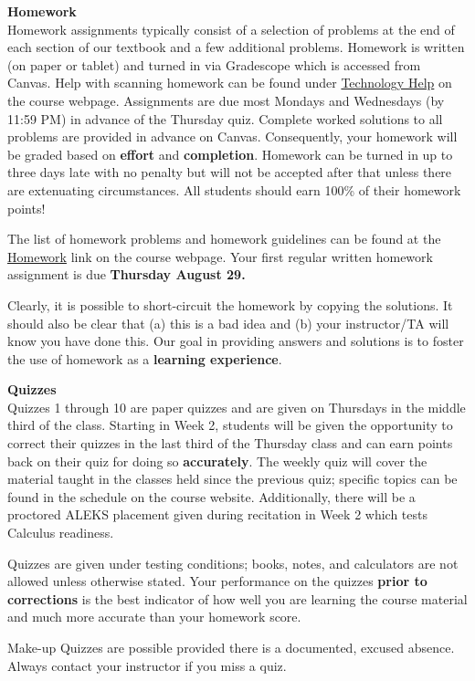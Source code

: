 \documentclass[12pt]{article}
\renewcommand{\emph}[1]{\textsf{\textbf{#1}}}
\newcommand{\localhead}[1]{\par\smallskip\textbf{#1}\nobreak\\}%
\def\heading#1{\localhead{\large\emph{#1}}}
\begin{document}
\heading{Homework}
Homework assignments typically consist of a selection of problems at the end of each section of our textbook and a few additional problems. Homework is written (on paper or tablet) and turned in via Gradescope which is accessed from Canvas.  Help with scanning homework can be found under \href{https://uaf-math251.github.io/techHelp.html}{Technology Help} on the course webpage. Assignments are due most Mondays and Wednesdays (by 11:59 PM) in advance of the Thursday quiz. Complete worked solutions to all problems are provided in advance on Canvas. Consequently, your homework will be graded based on \emph{effort} and \emph{completion}. Homework can be turned in up to three days late with no penalty but will not be accepted after that unless there are extenuating circumstances. All students should earn 100\% of their homework points!

The list of homework problems and homework guidelines can be found at the \href{https://uaf-math251.github.io/newhomework.html}{Homework} link on the course webpage. Your first regular written homework assignment is due \emph{Thursday August 29.}

Clearly, it is possible to short-circuit the homework by copying the solutions. It should also be clear that (a) this is a bad idea and (b) your instructor/TA will know you have done this. Our goal in providing answers and solutions is to foster the use of homework as a \emph{learning experience}. 



\heading{Quizzes}
Quizzes 1 through 10 are paper quizzes and are given on Thursdays in the middle third of the class. Starting in Week 2, students will be given the opportunity to correct their quizzes in the last third of the Thursday class and can earn points back on their quiz for doing so \emph{accurately}. The weekly quiz will cover the material taught in the classes held since the previous quiz; specific topics can be found in the schedule on the course website. Additionally, there will be a proctored ALEKS placement given during recitation in Week 2 which tests Calculus readiness.

Quizzes are given under testing conditions; books, notes, and calculators are not allowed unless otherwise stated. Your performance on the quizzes \emph{prior to corrections} is the best indicator of how well you are learning the course material and much more accurate than your homework score.

Make-up Quizzes are possible provided there is a documented, excused absence. Always contact your instructor if you miss a quiz.
\end{document}

